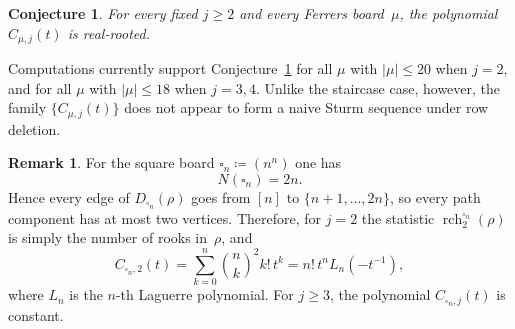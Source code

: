 \documentclass[11pt,reqno]{amsart}
\newtheorem{conjecture}[theorem]{Conjecture}
\theoremstyle{definition}
\newtheorem{remark}[theorem]{Remark}
\begin{document}
\begin{conjecture}\label{conj:ferrers_path_rr}
For every fixed $j \geq 2$ and every Ferrers board~$\mu$,
the polynomial $C_{\mu,j}(t)$ is real-rooted.
\end{conjecture}

Computations currently support Conjecture~\ref{conj:ferrers_path_rr}
for all $\mu$ with $|\mu| \leq 20$ when $j=2$, and for all $\mu$
with $|\mu| \leq 18$ when $j=3,4$.
Unlike the staircase case, however, the family
$\{C_{\mu,j}(t)\}$ does not appear to form a naive Sturm sequence under
row deletion.

\begin{remark}\label{rem:square_path}
For the square board $\square_n \coloneqq (n^n)$ one has
\[
  N(\square_n) = 2n.
\]
Hence every edge of $D_{\square_n}(\rho)$ goes from $[n]$ to
$\{n+1,\dotsc,2n\}$, so every path component has at most two vertices.
Therefore, for $j=2$ the statistic $\operatorname{rch}^{\square_n}_2(\rho)$
is simply the number of rooks in~$\rho$, and
\[
  C_{\square_n,2}(t)
  =
  \sum_{k=0}^{n} \binom{n}{k}^2 k!\, t^k
  =
  n! \, t^n L_n(-t^{-1}),
\]
where $L_n$ is the $n$-th Laguerre polynomial.
For $j \geq 3$, the polynomial $C_{\square_n,j}(t)$ is constant.
\end{remark}
\end{document}

